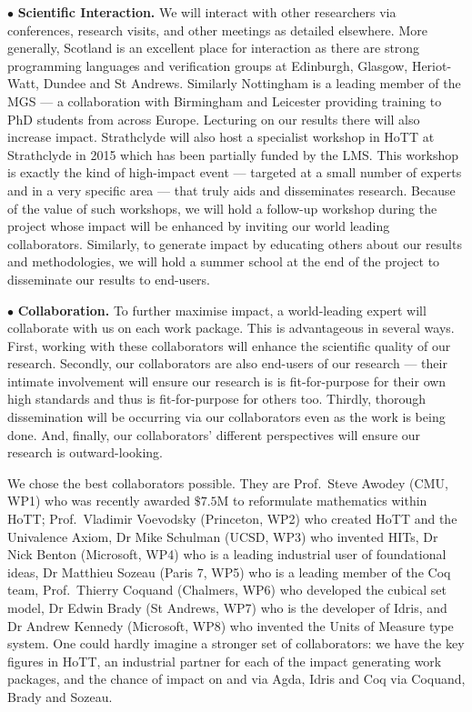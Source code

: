 \documentclass[a4paper,11pt]{article}
\begin{document}
\vspace*{0.02in} $\bullet$ {\bf Scientific Interaction.} We will
interact with other researchers via conferences,
research visits, and other meetings as detailed elsewhere. More
generally, Scotland is an excellent place for interaction as there are
strong programming languages and verification groups at Edinburgh,
Glasgow, Heriot-Watt, Dundee and St Andrews. Similarly Nottingham is a
leading member of the MGS --- a collaboration with Birmingham and
Leicester providing training to PhD students
from across Europe. Lecturing on our results there will also increase
impact. Strathclyde will also host a specialist
workshop in HoTT at Strathclyde in 2015 which has been partially
funded by the LMS. This workshop is exactly the kind of high-impact
event --- targeted at a small number of experts and in a very specific
area --- that truly aids and disseminates research. Because of the
value of such workshops, we will hold a follow-up workshop during
the project whose impact will be enhanced by inviting our
world leading collaborators. Similarly, to generate impact by
educating others about our results and methodologies, we will hold a
summer school at the end of the project to disseminate our results to
end-users.

\vspace*{0.02in}

$\bullet$ {\bf Collaboration.} To further maximise impact, a
world-leading expert will collaborate with us on each work package.
This is advantageous in several ways. First, working with these
collaborators will enhance the scientific quality of our
research. Secondly, our collaborators are also end-users of our
research --- their intimate involvement will ensure our research is is
fit-for-purpose for their own high standards and thus is
fit-for-purpose for others too. Thirdly, thorough dissemination will
be occurring via our collaborators even as the work is being
done. And, finally, our collaborators' different perspectives will
ensure our research is outward-looking.

We chose the best collaborators possible. They are Prof.\ Steve
Awodey (CMU, WP1) who was recently awarded $\$7.5$M to reformulate
mathematics within HoTT; Prof.\ Vladimir Voevodsky (Princeton, WP2)
who created HoTT and the Univalence Axiom, Dr Mike Schulman (UCSD,
WP3) who invented HITs, Dr Nick Benton (Microsoft, WP4) who is a
leading industrial user of foundational ideas, Dr Matthieu Sozeau
(Paris 7, WP5) who is a leading member of the Coq team, Prof.\ Thierry
Coquand (Chalmers, WP6) who developed the cubical set model, Dr Edwin
Brady (St Andrews, WP7) who is the developer of Idris, and Dr Andrew
Kennedy (Microsoft, WP8) who invented the Units of Measure type
system. One could hardly imagine a stronger set of collaborators: we
have the key figures in HoTT, an industrial partner for each of the
impact generating work packages, and the chance of impact on and via
Agda, Idris and Coq via Coquand, Brady and Sozeau.
\end{document}
